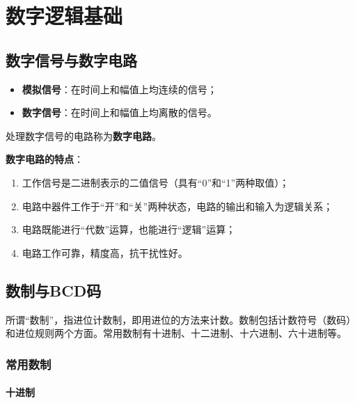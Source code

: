 \chapter{数字逻辑基础}
\label{chap:数字逻辑基础}

\section{数字信号与数字电路}
\label{sec:数字信号与数字电路}

\begin{definition}[模拟信号与数字信号]
\label{def:模拟与数字信号}
\begin{itemize}
	\item \textbf{模拟信号}：在时间上和幅值上均连续的信号；
	\item \textbf{数字信号}：在时间上和幅值上均离散的信号。
\end{itemize}
处理数字信号的电路称为\textbf{数字电路}。
\end{definition}

\textbf{数字电路的特点}：
\begin{enumerate}
	\item 工作信号是二进制表示的二值信号（具有“0”和“1”两种取值）；
	\item 电路中器件工作于“开”和“关”两种状态，电路的输出和输入为逻辑关系；
	\item 电路既能进行“代数”运算，也能进行“逻辑”运算；
	\item 电路工作可靠，精度高，抗干扰性好。
\end{enumerate}

\section{数制与BCD码}
\label{sec:数制与BCD码}

所谓“数制”，指进位计数制，即用进位的方法来计数。数制包括计数符号（数码）和进位规则两个方面。常用数制有十进制、十二进制、十六进制、六十进制等。

\subsection{常用数制}
\label{sec:常用数制}

\subsubsection{十进制}

